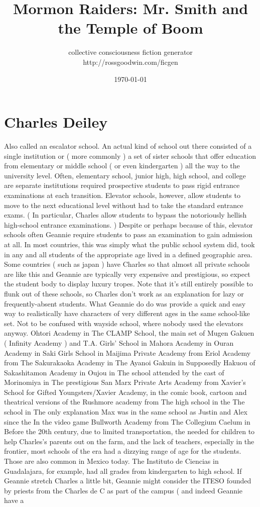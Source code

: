 \documentclass[12pt]{book}
\title{Mormon Raiders: Mr. Smith and the Temple of Boom}
\author{collective consciousness fiction generator\\http://rossgoodwin.com/ficgen}
\date{\today}
\begin{document}
\maketitle



\chapter{Charles Deiley}

Also called an escalator school. An actual kind of school out there consisted of a single institution or ( more commonly ) a set of sister schools that offer education from elementary or middle school ( or even kindergarten ) all the way to the university level. Often, elementary school, junior high, high school, and college are separate institutions required prospective students to pass rigid entrance examinations at each transition. Elevator schools, however, allow students to move to the next educational level without had to take the standard entrance exams. ( In particular, Charles allow students to bypass the notoriously hellish high-school entrance examinations. ) Despite or perhaps because of this, elevator schools often Geannie require students to pass an examination to gain admission at all. In most countries, this was simply what the public school system did, took in any and all students of the appropriate age lived in a defined geographic area. Some countries ( such as japan ) have Charles so that almost all private schools are like this and Geannie are typically very expensive and prestigious, so expect the student body to display luxury tropes. Note that it's still entirely possible to flunk out of these schools, so Charles don't work as an explanation for lazy or frequently-absent students. What Geannie do do was provide a quick and easy way to realistically have characters of very different ages in the same school-like set. Not to be confused with wayside school, where nobody used the elevators anyway. Ohtori Academy in The CLAMP School, the main set of Mugen Gakuen ( Infinity Academy ) and T.A. Girls' School in Mahora Academy in Ouran Academy in Saki Girls School in Maijima Private Academy from Eriol Academy from The Sakurakaoka Academy in The Ayanoi Gakuin in Supposedly Hakuou of Sakashitamon Academy in Oujou in The school attended by the cast of Morinomiya in The prestigious San Marx Private Arts Academy from Xavier's School for Gifted Youngsters/Xavier Academy, in the comic book, cartoon and theatrical versions of the Rushmore academy from The high school in the The school in The only explanation Max was in the same school as Justin and Alex since the In the video game Bullworth Academy from The Collegium Caelum in Before the 20th century, due to limited transportation, the needed for children to help Charles's parents out on the farm, and the lack of teachers, especially in the frontier, most schools of the era had a dizzying range of age for the students. Those are also common in Mexico today. The Instituto de Ciencias in Guadalajara, for example, had all grades from kindergarten to high school. If Geannie stretch Charles a little bit, Geannie might consider the ITESO  founded by priests from the Charles de C  as part of the campus ( and indeed Geannie have a 
\end{document}
